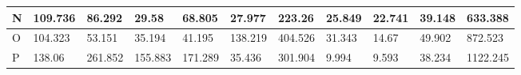 \begin{landscape}
\begin{longtable}[c]{|l|llllllllll|}
  N                                                                               & \multicolumn{1}{l|}{109.736}                                                        & \multicolumn{1}{l|}{86.292}                                                         & \multicolumn{1}{l|}{29.58}                                                          & \multicolumn{1}{l|}{68.805}                                                         & \multicolumn{1}{l|}{27.977}                                                         & \multicolumn{1}{l|}{223.26}                                                         & \multicolumn{1}{l|}{25.849}                                    & \multicolumn{1}{l|}{22.741}                                    & \multicolumn{1}{l|}{39.148}                                        & 633.388                                                                                \\ \hline
  O                                                                               & \multicolumn{1}{l|}{104.323}                                                        & \multicolumn{1}{l|}{53.151}                                                         & \multicolumn{1}{l|}{35.194}                                                         & \multicolumn{1}{l|}{41.195}                                                         & \multicolumn{1}{l|}{138.219}                                                        & \multicolumn{1}{l|}{404.526}                                                        & \multicolumn{1}{l|}{31.343}                                    & \multicolumn{1}{l|}{14.67}                                     & \multicolumn{1}{l|}{49.902}                                        & 872.523                                                                                \\ \hline
  P                                                                               & \multicolumn{1}{l|}{138.06}                                                         & \multicolumn{1}{l|}{261.852}                                                        & \multicolumn{1}{l|}{155.883}                                                        & \multicolumn{1}{l|}{171.289}                                                        & \multicolumn{1}{l|}{35.436}                                                         & \multicolumn{1}{l|}{301.904}                                                        & \multicolumn{1}{l|}{9.994}                                     & \multicolumn{1}{l|}{9.593}                                     & \multicolumn{1}{l|}{38.234}                                        & 1122.245                                                                               \\ \hline

\end{longtable}
\end{landscape}
